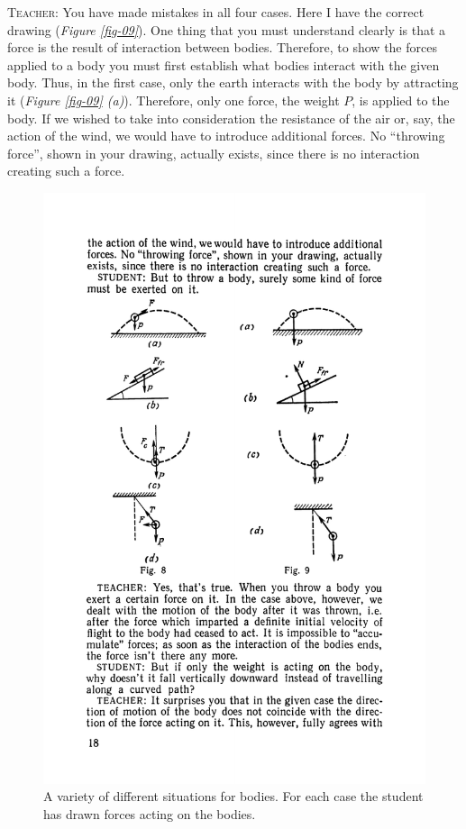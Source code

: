 \documentclass[a4paper,sfsidenotes]{tufte-book}
\begin{document}
\textsc{Teacher:} You have made mistakes in all four cases. Here I have the correct drawing (\emph{Figure \ref{fig-09}}). One thing that you must understand clearly is that a force is the result of interaction between bodies. Therefore, to show the forces applied to a body you must first establish what bodies
interact with the given body. Thus, in the first case, only the earth interacts with the body by attracting it (\emph{Figure \ref{fig-09} (a)}). Therefore, only one force, the weight $P$, is applied to the body. If we wished to take into consideration the resistance of the air or, say, the action of the wind, we would have to introduce additional forces. No ``throwing force'', shown in your drawing, actually exists, since there is no interaction creating such a force.\\


\begin{figure}
\centering
\includegraphics[width=0.4\linewidth]{fig-008a.pdf}
\caption{A variety of different situations for bodies. For each case the student has drawn forces acting on the bodies.}
\label{fig-08}
\end{figure}
\end{document}
